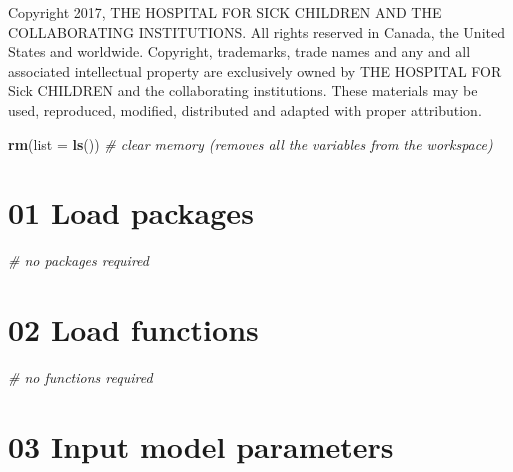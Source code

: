 \documentclass[
]{article}
\newenvironment{Shaded}{\begin{snugshade}}{\end{snugshade}}
\newcommand{\CommentTok}[1]{\textcolor[rgb]{0.56,0.35,0.01}{\textit{#1}}}
\newcommand{\DataTypeTok}[1]{\textcolor[rgb]{0.13,0.29,0.53}{#1}}
\newcommand{\KeywordTok}[1]{\textcolor[rgb]{0.13,0.29,0.53}{\textbf{#1}}}
\newcommand{\NormalTok}[1]{#1}
\begin{document}
Copyright 2017, THE HOSPITAL FOR SICK CHILDREN AND THE COLLABORATING
INSTITUTIONS. All rights reserved in Canada, the United States and
worldwide. Copyright, trademarks, trade names and any and all associated
intellectual property are exclusively owned by THE HOSPITAL FOR Sick
CHILDREN and the collaborating institutions. These materials may be
used, reproduced, modified, distributed and adapted with proper
attribution.

\newpage

\begin{Shaded}
\begin{Highlighting}[]
\KeywordTok{rm}\NormalTok{(}\DataTypeTok{list =} \KeywordTok{ls}\NormalTok{())      }\CommentTok{# clear memory (removes all the variables from the workspace)}
\end{Highlighting}
\end{Shaded}

\hypertarget{load-packages}{%
\section{01 Load packages}\label{load-packages}}

\begin{Shaded}
\begin{Highlighting}[]
\CommentTok{# no packages required}
\end{Highlighting}
\end{Shaded}

\hypertarget{load-functions}{%
\section{02 Load functions}\label{load-functions}}

\begin{Shaded}
\begin{Highlighting}[]
\CommentTok{# no functions required}
\end{Highlighting}
\end{Shaded}

\hypertarget{input-model-parameters}{%
\section{03 Input model parameters}\label{input-model-parameters}}
\end{document}
